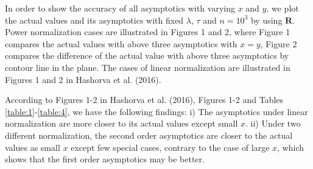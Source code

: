 \documentclass[10pt,twosided]{article}
\numberwithin{equation}{section}
\numberwithin{equation}{section}
\begin{document}
In order to show the accuracy of all asymptotics with varying $x$ and $y$, we plot the
actual values and its asymptotics with fixed $\lambda$, $\tau$ and $n=10^3$ by using $\mathbf{R}$. Power normalization cases are illustrated in Figures 1 and 2, where Figure 1 compares the actual values with above three asymptotics with $x=y$, Figure 2 compares the difference of the actual value with above three asymptotics by contour line in the plane. The cases of linear normalization are illustrated in Figures 1 and 2 in Hashorva et al. (2016).

According to Figures 1-2 in Hashorva et al. (2016), Figures 1-2 and Tables \ref{table:1}-\ref{table:4}, we have the following findings: i) The asymptotics
under linear normalization are more closer to its actual values except small $x$.
ii) Under two different normalization, the second
order asymptotics are closer to the actual values as small $x$ except few special cases, contrary to the case of large
$x$, which shows that the first order asymptotics may be better.
\end{document}
